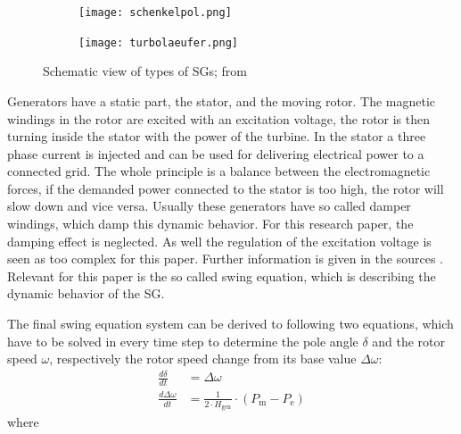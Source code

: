 \begin{figure}[H]
        \centering
        \begin{subfigure}[b]{.49\textwidth}
                \centering
                \texttt{[image: schenkelpol.png]}
        \end{subfigure}
        \begin{subfigure}[b]{.49\textwidth}
                \centering
                \texttt{[image: turbolaeufer.png]}
        \end{subfigure}
        \caption[Types of \acfp{SG}]{Schematic view of types of \acfp{SG}; from \autocite{oedingElektrischeKraftwerkeUnd2016}}
        \label{fig:generators}
\end{figure}

Generators have a static part, the stator, and the moving rotor. The magnetic windings in the rotor are excited with an excitation voltage, the rotor is then turning inside the stator with the power of the turbine. In the stator a three phase current is injected and can be used for delivering electrical power to a connected grid. The whole principle is a balance between the electromagnetic forces, if the demanded power connected to the stator is too high, the rotor will slow down and vice versa. Usually these generators have so called damper windings, which damp this dynamic behavior. For this research paper, the damping effect is neglected. As well the regulation of the excitation voltage is seen as too complex for this paper. Further information is given in the sources \autocite{machowskiPowerSystemDynamics2020,kundurPowerSystemStability2022,oedingElektrischeKraftwerkeUnd2016,schwabElektroenergiesystemeSmarteStromversorgung2022}. Relevant for this paper is the so called swing equation, which is describing the dynamic behavior of the \acs{SG}.

The final swing equation system can be derived to following two equations, which have to be solved in every time step to determine the pole angle $\delta$ and the rotor speed $\omega$, respectively the rotor speed change from its base value $\Delta\omega$:
\begin{align}
        \frac{d\delta}{dt}       & =\Delta\omega \label{eq:swing1}                                                         \\[12pt]
        \frac{d\Delta\omega}{dt} & =\frac{1}{2 \cdot H_\mathrm{gen}} \cdot (P_\mathrm{m} - P_\mathrm{e}) \label{eq:swing2}
\end{align}
where

